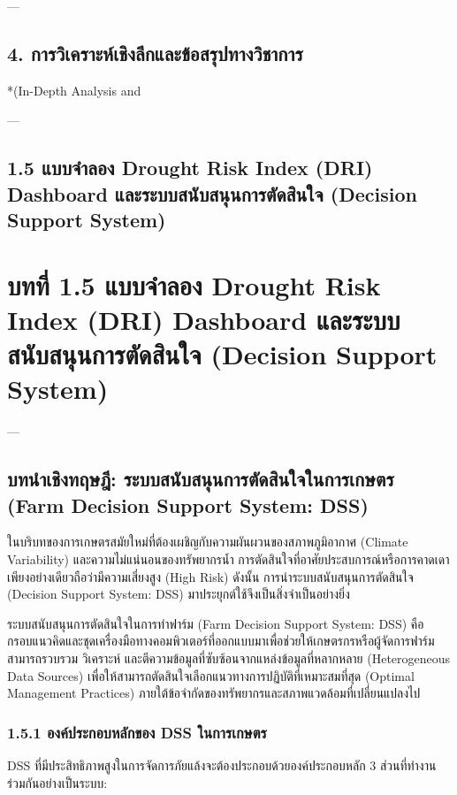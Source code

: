 \documentclass[11pt,a4paper,openany]{report}
\begin{document}
---

\section{4. การวิเคราะห์เชิงลึกและข้อสรุปทางวิชาการ}

*(In-Depth Analysis and


---

\section{1.5 แบบจำลอง Drought Risk Index (DRI) Dashboard และระบบสนับสนุนการตัดสินใจ (Decision Support System)}


\chapter{บทที่ 1.5 แบบจำลอง Drought Risk Index (DRI) Dashboard และระบบสนับสนุนการตัดสินใจ (Decision Support System)}


---

\section{บทนำเชิงทฤษฎี: ระบบสนับสนุนการตัดสินใจในการเกษตร (Farm Decision Support System: DSS)}


ในบริบทของการเกษตรสมัยใหม่ที่ต้องเผชิญกับความผันผวนของสภาพภูมิอากาศ (Climate Variability) และความไม่แน่นอนของทรัพยากรน้ำ การตัดสินใจที่อาศัยประสบการณ์หรือการคาดเดาเพียงอย่างเดียวถือว่ามีความเสี่ยงสูง (High Risk) ดังนั้น การนำระบบสนับสนุนการตัดสินใจ (Decision Support System: DSS) มาประยุกต์ใช้จึงเป็นสิ่งจำเป็นอย่างยิ่ง

ระบบสนับสนุนการตัดสินใจในการทำฟาร์ม (Farm Decision Support System: DSS) คือ กรอบแนวคิดและชุดเครื่องมือทางคอมพิวเตอร์ที่ออกแบบมาเพื่อช่วยให้เกษตรกรหรือผู้จัดการฟาร์มสามารถรวบรวม วิเคราะห์ และตีความข้อมูลที่ซับซ้อนจากแหล่งข้อมูลที่หลากหลาย (Heterogeneous Data Sources) เพื่อให้สามารถตัดสินใจเลือกแนวทางการปฏิบัติที่เหมาะสมที่สุด (Optimal Management Practices) ภายใต้ข้อจำกัดของทรัพยากรและสภาพแวดล้อมที่เปลี่ยนแปลงไป

\subsection{1.5.1 องค์ประกอบหลักของ DSS ในการเกษตร}


DSS ที่มีประสิทธิภาพสูงในการจัดการภัยแล้งจะต้องประกอบด้วยองค์ประกอบหลัก 3 ส่วนที่ทำงานร่วมกันอย่างเป็นระบบ:
\end{document}
